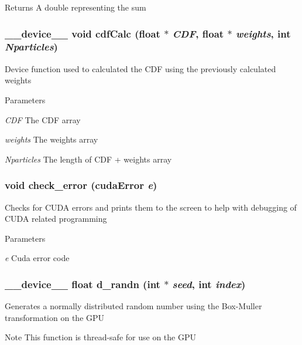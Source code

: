 \begin{DoxyReturn}{Returns}
A double representing the sum 
\end{DoxyReturn}
\hypertarget{ex__particle__CUDA__float_8cu_ac2312c222c3a30edb9076abc60561429}{
\subsubsection[{cdfCalc}]{\setlength{\rightskip}{0pt plus 5cm}\_\-\_\-device\_\-\_\- void cdfCalc (float $\ast$ {\em CDF}, \/  float $\ast$ {\em weights}, \/  int {\em Nparticles})}}
\label{ex__particle__CUDA__float_8cu_ac2312c222c3a30edb9076abc60561429}
Device function used to calculated the CDF using the previously calculated weights 
\begin{DoxyParams}{Parameters}
\item[{\em CDF}]The CDF array \item[{\em weights}]The weights array \item[{\em Nparticles}]The length of CDF + weights array \end{DoxyParams}
\hypertarget{ex__particle__CUDA__float_8cu_a4a894e10d3ce85515e41ac09c7f052c3}{
\subsubsection[{check\_\-error}]{\setlength{\rightskip}{0pt plus 5cm}void check\_\-error (cudaError {\em e})}}
\label{ex__particle__CUDA__float_8cu_a4a894e10d3ce85515e41ac09c7f052c3}
Checks for CUDA errors and prints them to the screen to help with debugging of CUDA related programming 
\begin{DoxyParams}{Parameters}
\item[{\em e}]Cuda error code \end{DoxyParams}
\hypertarget{ex__particle__CUDA__float_8cu_ae73ea1d15de0775879be9d0457189f32}{
\subsubsection[{d\_\-randn}]{\setlength{\rightskip}{0pt plus 5cm}\_\-\_\-device\_\-\_\- float d\_\-randn (int $\ast$ {\em seed}, \/  int {\em index})}}
\label{ex__particle__CUDA__float_8cu_ae73ea1d15de0775879be9d0457189f32}
Generates a normally distributed random number using the Box-\/Muller transformation on the GPU \begin{DoxyNote}{Note}
This function is thread-\/safe for use on the GPU 
\end{DoxyNote}

